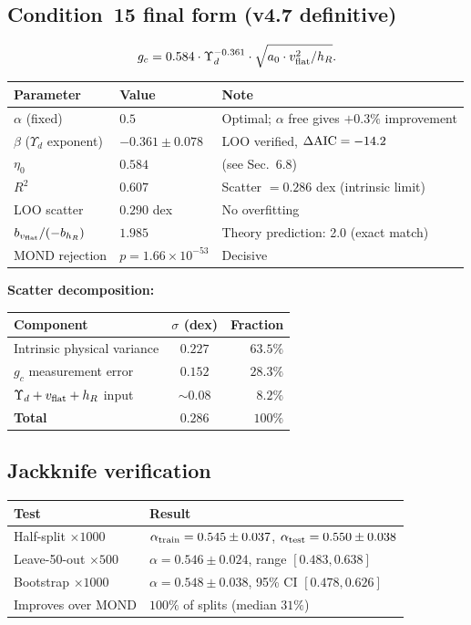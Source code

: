 \documentclass[11pt,a4paper]{article}
\newcommand{\gc}{g_{c}}
\newcommand{\ao}{a_{0}}
\newcommand{\vflat}{v_{\rm flat}}
\newcommand{\hR}{h_{R}}
\newcommand{\Yd}{\Upsilon_{d}}
\newcommand{\AIC}{\Delta{\rm AIC}}
\begin{document}
\subsection{Condition~15 final form (v4.7 definitive)}
\begin{equation}
\gc = 0.584 \cdot \Yd^{-0.361} \cdot \sqrt{\ao \cdot \vflat^2/\hR}.
\label{eq:C15}
\end{equation}
\begin{center}\small
\begin{tabular}{@{}llp{60mm}@{}}
\toprule
Parameter & Value & Note \\
\midrule
$\alpha$ (fixed) & $0.5$ & Optimal; $\alpha$ free gives $+0.3\%$ improvement \\
$\beta$ ($\Yd$ exponent) & $-0.361 \pm 0.078$ & LOO verified, $\AIC = -14.2$ \\
$\eta_0$ & $0.584$ & (see Sec.~6.8) \\
$R^2$ & $0.607$ & Scatter $= 0.286$ dex (intrinsic limit) \\
LOO scatter & $0.290$ dex & No overfitting \\
$b_{\vflat}/(-b_{\hR})$ & $1.985$ & Theory prediction: 2.0 (exact match) \\
MOND rejection & $p = 1.66 \times 10^{-53}$ & Decisive \\
\bottomrule
\end{tabular}
\end{center}

\textbf{Scatter decomposition:}
\begin{center}\small
\begin{tabular}{@{}lcr@{}}
\toprule
Component & $\sigma$ (dex) & Fraction \\
\midrule
Intrinsic physical variance & $0.227$ & $63.5\%$ \\
$\gc$ measurement error & $0.152$ & $28.3\%$ \\
$\Yd + \vflat + \hR$ input & $\sim 0.08$ & $8.2\%$ \\
\textbf{Total} & $0.286$ & $100\%$ \\
\bottomrule
\end{tabular}
\end{center}

\subsection{Jackknife verification}
\begin{center}\small
\begin{tabular}{@{}lp{80mm}@{}}
\toprule
Test & Result \\
\midrule
Half-split $\times 1000$ & $\alpha_{\rm train} = 0.545 \pm 0.037$, $\alpha_{\rm test} = 0.550 \pm 0.038$ \\
Leave-50-out $\times 500$ & $\alpha = 0.546 \pm 0.024$, range $[0.483, 0.638]$ \\
Bootstrap $\times 1000$ & $\alpha = 0.548 \pm 0.038$, 95\% CI $[0.478, 0.626]$ \\
Improves over MOND & $100\%$ of splits (median $31\%$) \\
\bottomrule
\end{tabular}
\end{center}
\end{document}
